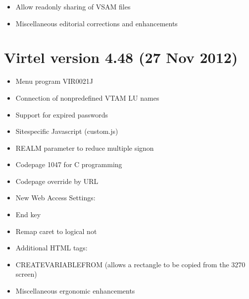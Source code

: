 \documentclass[letterpaper,10pt,english]{sphinxmanual}
\begin{document}
\sphinxAtStartPar
{}
\begin{itemize}
\item {} 
\sphinxAtStartPar
Allow read\sphinxhyphen{}only sharing of VSAM files

\end{itemize}

\sphinxAtStartPar
{}
\begin{itemize}
\item {} 
\sphinxAtStartPar
Miscellaneous editorial corrections and enhancements

\end{itemize}


\section{Virtel version 4.48 (27 Nov 2012)}
\label{\detokenize{Installation_Guide:virtel-version-4-48-27-nov-2012}}
\sphinxAtStartPar
{}
\begin{itemize}
\item {} 
\sphinxAtStartPar
Menu program VIR0021J

\end{itemize}

\sphinxAtStartPar
{}
\begin{itemize}
\item {} 
\sphinxAtStartPar
Connection of non\sphinxhyphen{}predefined VTAM LU names

\item {} 
\sphinxAtStartPar
Support for expired passwords

\item {} 
\sphinxAtStartPar
Site\sphinxhyphen{}specific Javascript (custom.js)

\item {} 
\sphinxAtStartPar
REALM parameter to reduce multiple signon

\item {} 
\sphinxAtStartPar
Codepage 1047 for C programming

\item {} 
\sphinxAtStartPar
Codepage override by URL

\item {} 
\sphinxAtStartPar
New Web Access Settings:

\item {} 
\sphinxAtStartPar
End key

\item {} 
\sphinxAtStartPar
Remap caret to logical not

\item {} 
\sphinxAtStartPar
Additional HTML tags:

\item {} 
\sphinxAtStartPar
CREATE\sphinxhyphen{}VARIABLE\sphinxhyphen{}FROM (allows a rectangle to be copied from the 3270 screen)

\item {} 
\sphinxAtStartPar
Miscellaneous ergonomic enhancements

\end{itemize}
\end{document}
